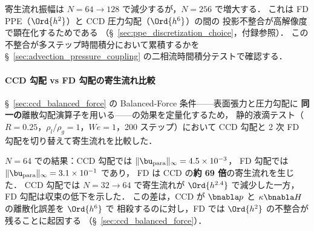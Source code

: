 寄生流れ振幅は $N = 64 \to 128$ で減少するが，$N = 256$ で増大する．
これは FD PPE（$\Ord{h^2}$）と CCD 圧力勾配（$\Ord{h^6}$）の間の
投影不整合が高解像度で顕在化するためである
（§~\ref{sec:ppe_discretization_choice}，付録参照）．
この不整合が多ステップ時間積分において累積するかを
§~\ref{sec:advection_pressure_coupling} の二相流時間積分テストで確認する．

\paragraph{CCD 勾配 vs FD 勾配の寄生流れ比較}

§~\ref{sec:ccd_balanced_force} の Balanced-Force 条件——表面張力と圧力勾配に
\textbf{同一の}離散勾配演算子を用いる——の効果を定量化するため，
静的液滴テスト（$R = 0.25$，$\rho_l/\rho_g = 1$，$\mathit{We} = 1$，200 ステップ）において
CCD 勾配と 2 次 FD 勾配を切り替えて寄生流れを比較した．

$N = 64$ での結果：CCD 勾配では $\|\bu_{\mathrm{para}}\|_\infty = 4.5 \times 10^{-3}$，
FD 勾配では $\|\bu_{\mathrm{para}}\|_\infty = 3.1 \times 10^{-1}$ であり，
FD は CCD の\textbf{約 69 倍}の寄生流れを生じた．
CCD 勾配では $N = 32 \to 64$ で寄生流れが $\Ord{h^{2.4}}$ で減少した一方，
FD 勾配は収束の低下を示した．
この差は，CCD が $\bnabla p$ と $\kappa\bnabla H$ の離散化誤差を $\Ord{h^6}$ で
相殺するのに対し，FD では $\Ord{h^2}$ の不整合が残ることに起因する
（§~\ref{sec:ccd_balanced_force}）．

